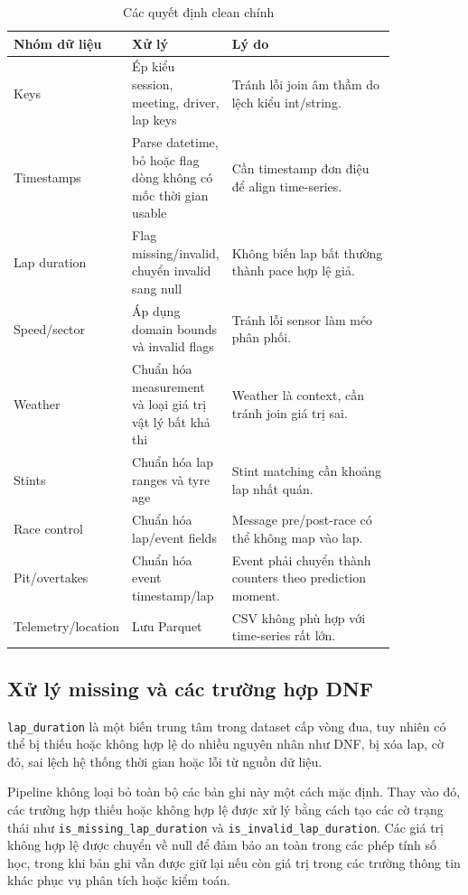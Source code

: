 \documentclass[conference]{IEEEtran}
\begin{document}
\begin{table}[htbp]
\caption{Các quyết định clean chính}
\label{tab:cleaning}
\centering
\begin{tabular}{p{0.18\linewidth}p{0.22\linewidth}p{0.44\linewidth}}
\toprule
Nhóm dữ liệu & Xử lý & Lý do \\
\midrule
Keys & Ép kiểu session, meeting, driver, lap keys & Tránh lỗi join âm thầm do lệch kiểu int/string. \\
Timestamps & Parse datetime, bỏ hoặc flag dòng không có mốc thời gian usable & Cần timestamp đơn điệu để align time-series. \\
Lap duration & Flag missing/invalid, chuyển invalid sang null & Không biến lap bất thường thành pace hợp lệ giả. \\
Speed/sector & Áp dụng domain bounds và invalid flags & Tránh lỗi sensor làm méo phân phối. \\
Weather & Chuẩn hóa measurement và loại giá trị vật lý bất khả thi & Weather là context, cần tránh join giá trị sai. \\
Stints & Chuẩn hóa lap ranges và tyre age & Stint matching cần khoảng lap nhất quán. \\
Race control & Chuẩn hóa lap/event fields & Message pre/post-race có thể không map vào lap. \\
Pit/overtakes & Chuẩn hóa event timestamp/lap & Event phải chuyển thành counters theo prediction moment. \\
Telemetry/location & Lưu Parquet & CSV không phù hợp với time-series rất lớn. \\
\bottomrule
\end{tabular}
\end{table}

\subsection{Xử lý missing và các trường hợp DNF}

\texttt{lap\_duration} là một biến trung tâm trong dataset cấp vòng đua, tuy nhiên có thể bị thiếu hoặc không hợp lệ do nhiều nguyên nhân như DNF, bị xóa lap, cờ đỏ, sai lệch hệ thống thời gian hoặc lỗi từ nguồn dữ liệu.

Pipeline không loại bỏ toàn bộ các bản ghi này một cách mặc định. Thay vào đó, các trường hợp thiếu hoặc không hợp lệ được xử lý bằng cách tạo các cờ trạng thái như \texttt{is\_missing\_lap\_duration} và \texttt{is\_invalid\_lap\_duration}. Các giá trị không hợp lệ được chuyển về null để đảm bảo an toàn trong các phép tính số học, trong khi bản ghi vẫn được giữ lại nếu còn giá trị trong các trường thông tin khác phục vụ phân tích hoặc kiểm toán.
\end{document}
